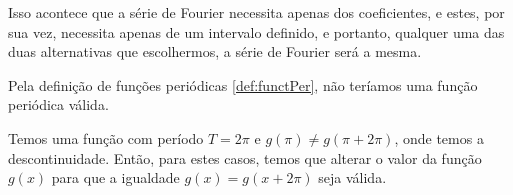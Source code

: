 Isso acontece que a série de Fourier necessita apenas dos coeficientes,
e estes, por sua vez, necessita apenas de um intervalo definido, e 
portanto, qualquer uma das duas alternativas que escolhermos, a série
de Fourier será a mesma. 
 


Pela definição de funções periódicas \ref{def:functPer}, não teríamos uma 
função periódica válida. 


Temos uma função com período $T = 2\pi$ e 
$g(\pi) \neq g(\pi + 2\pi)$, onde temos a descontinuidade. Então, para estes 
casos, temos que alterar o valor da função $g(x)$ para que a igualdade 
$g(x) = g(x + 2\pi)$ seja válida.


